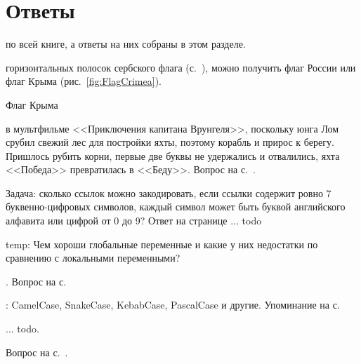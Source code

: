 \chapter{Ответы}
\label{ch:answers}


 по всей книге, а ответы на них собраны в этом разделе.

\begin{task}
    \label{answer:Tricolor-flags}
     горизонтальных полосок 
    сербского флага (с.~\pageref{fig:Srpska}), можно получить флаг России 
    или флаг Крыма (рис.~\ref{fig:FlagCrimea}). 
\end{task}

\begin{marginfigure}[0cm]
{%
\setlength{\fboxsep}{0pt}%
\setlength{\fboxrule}{1pt}%
%
}%
\caption{Флаг Крыма}
\label{fig:FlagCrimea}
\end{marginfigure}

\begin{task}
    \label{answer:Pobeda-beda}
     в мультфильме <<Приключения капитана 
    Врунгеля>>, поскольку юнга Лом срубил свежий лес для постройки яхты, поэтому корабль 
    и прирос к берегу. Пришлось рубить корни, первые две буквы не удержались и отвалились, 
    яхта <<Победа>> превратилась в <<Беду>>. 
    \small{Вопрос на с.~\pageref{fig:Pobeda-beda}.}
\end{task}

Задача: сколько ссылок можно закодировать, если ссылки содержит ровно 7 буквенно-цифровых символов,
     каждый символ может быть буквой английского алфавита 
     или цифрой от 0 до 9? Ответ на странице ... todo 

temp: Чем хороши глобальные переменные и какие у них недостатки
по сравнению с локальными переменными?

\begin{task}
    \label{answer:guess_numbers_task}
    . 
    \small{Вопрос на с.~\pageref{question:text}}
\end{task}

\begin{task}
    \label{answer:naming}
    : CamelCase, SnakeCase, KebabCase, PascalCase и другие. 
    \small{Упоминание на с.~\pageref{styles}}
\end{task}

\begin{task}
    \label{answer:global-vars-pros-cons}
     ... todo. 

    \small{Вопрос на с.~\pageref{fig:block:proc:swap:colors}.}
\end{task}

